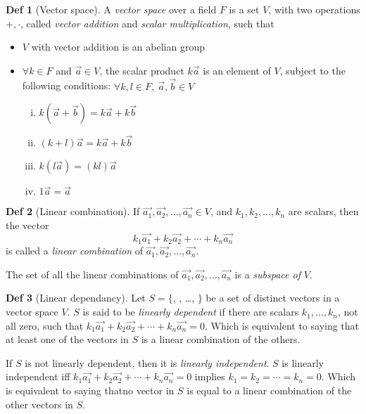 \documentclass{article}
\theoremstyle{definition}
\newtheorem{definition}{Def}[section]
\begin{document}
\begin{definition}[Vector space]
    A \emph{vector space} over a field $F$ is a set $V$, with two operations $+, \cdot$, called \emph{vector addition} and \emph{scalar multiplication}, such that

    \begin{itemize}
	\item $V$ with vector addition is an abelian group
	\item $\forall k \in F$ and $\overrightarrow{a} \in V$, the scalar product $k \overrightarrow{a}$ is an element of $V$, subject to the following conditions:
	    $\forall k, l \in F,~\overrightarrow{a},\overrightarrow{b} \in V$
	    \begin{enumerate}[i.]
		\item $k(\overrightarrow{a} + \overrightarrow{b}) = k\overrightarrow{a} + k\overrightarrow{b}$
		\item $(k + l)\overrightarrow{a} = k\overrightarrow{a} + k\overrightarrow{b}$
		\item $k(l\overrightarrow{a}) = (kl)\overrightarrow{a}$
		\item $1 \overrightarrow{a} = \overrightarrow{a}$
	    \end{enumerate}
    \end{itemize}
\end{definition}

\begin{definition}[Linear combination]
    If $\overrightarrow{a_1}, \overrightarrow{a_2}, \ldots, \overrightarrow{a_n} \in V$, and $k_1, k_2, \ldots, k_n$ are scalars, then the vector
    $$k_1 \overrightarrow{a_1} + k_2 \overrightarrow{a_2} + \cdots + k_n \overrightarrow{a_n}$$
    is called a \emph{linear combination} of $\overrightarrow{a_1}, \overrightarrow{a_2}, \ldots, \overrightarrow{a_n}$.

    The set of all the linear combinations of $\overrightarrow{a_1}, \overrightarrow{a_2}, \ldots, \overrightarrow{a_n}$ is a \emph{subspace of} $V$.
\end{definition}

\begin{definition}[Linear dependancy]
    Let $S = \{$, , \ldots, $\}$ be a set of distinct vectors in a vector space $V$. $S$ is said to be \emph{linearly dependent} if there are scalars $k_1, \ldots, k_n$, not all zero, such that $k_1 \overrightarrow{a_1} + k_2 \overrightarrow{a_2} + \cdots + k_n \overrightarrow{a_n} = 0$.
    Which is equivalent to saying that at least one of the vectors in $S$ is a linear combination of the others.

    If $S$ is not linearly dependent, then it is \emph{linearly independent}. $S$ is linearly independent iff $k_1 \overrightarrow{a_1} + k_2 \overrightarrow{a_2} + \cdots + k_n \overrightarrow{a_n}=0$ implies $k_1 = k_2 = \cdots =  k_n =0$.
    Which is equivalent to saying thatno vector in $S$ is equal to a linear combination of the other vectors in $S$.
\end{definition}
\end{document}
